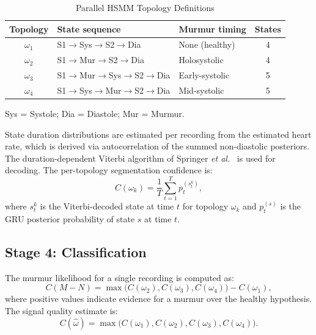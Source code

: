 \documentclass[conference]{IEEEtran}
\begin{document}
\begin{table}[t]
  \caption{Parallel HSMM Topology Definitions}
  \label{tab:hsmm}
  \centering
  \small
  \begin{threeparttable}
  \begin{tabular}{c l l c}
    \toprule
    \textbf{Topology} & \textbf{State sequence} & \textbf{Murmur timing} & \textbf{States} \\
    \midrule
    $\omega_1$ & S1$\to$Sys$\to$S2$\to$Dia & None (healthy) & 4 \\
    $\omega_2$ & S1$\to$Mur$\to$S2$\to$Dia & Holosystolic    & 4 \\
    $\omega_3$ & S1$\to$Mur$\to$Sys$\to$S2$\to$Dia & Early-systolic & 5 \\
    $\omega_4$ & S1$\to$Sys$\to$Mur$\to$S2$\to$Dia & Mid-systolic   & 5 \\
    \bottomrule
  \end{tabular}
  \begin{tablenotes}
    \footnotesize
    \item Sys = Systole; Dia = Diastole; Mur = Murmur.
  \end{tablenotes}
  \end{threeparttable}
\end{table}

State duration distributions are estimated per recording from the
estimated heart rate, which is derived via autocorrelation of the
summed non-diastolic posteriors. The duration-dependent Viterbi
algorithm of Springer \textit{et al.}~\cite{springer2016} is used
for decoding. The per-topology segmentation confidence is:
%
\begin{equation}
  C(\omega_k) = \frac{1}{T} \sum_{t=1}^{T} p_t^{(s_t^k)},
  \label{eq:conf}
\end{equation}
%
where $s_t^k$ is the Viterbi-decoded state at time $t$ for topology
$\omega_k$ and $p_t^{(s)}$ is the GRU posterior probability of
state $s$ at time $t$.

\subsection{Stage 4: Classification}

The murmur likelihood for a single recording is computed as:
%
\begin{equation}
  C(M\!-\!N) = \max\bigl(C(\omega_2), C(\omega_3), C(\omega_4)\bigr) - C(\omega_1),
  \label{eq:cmn}
\end{equation}
%
where positive values indicate evidence for a murmur over the healthy
hypothesis. The signal quality estimate is:
%
\begin{equation}
  C(\hat{\omega}) = \max\bigl(C(\omega_1), C(\omega_2), C(\omega_3), C(\omega_4)\bigr).
  \label{eq:chat}
\end{equation}
\end{document}
